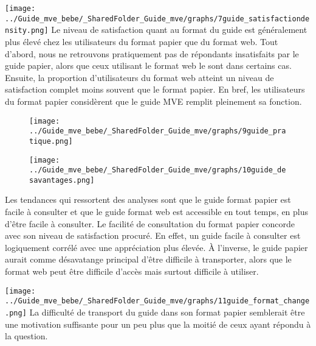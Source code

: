 \documentclass[
]{article}
\begin{document}
\texttt{[image: ../Guide\_mve\_bebe/\_SharedFolder\_Guide\_mve/graphs/7guide\_satisfactiondensity.png]}
Le niveau de satisfaction quant au format du guide est généralement plus
élevé chez les utilisateurs du format papier que du format web. Tout
d'abord, nous ne retrouvons pratiquement pas de répondants insatisfaits
par le guide papier, alors que ceux utilisant le format web le sont dans
certains cas. Ensuite, la proportion d'utilisateurs du format web
atteint un niveau de satisfaction complet moins souvent que le format
papier. En bref, les utilisateurs du format papier considèrent que le
guide MVE remplit pleinement sa fonction.

\newpage
\begin{figure}[htbp]
  \centering
  \begin{minipage}{0.5\textwidth}
    \texttt{[image: ../Guide\_mve\_bebe/\_SharedFolder\_Guide\_mve/graphs/9guide\_pratique.png]}
  \end{minipage}%
  \begin{minipage}{0.5\textwidth}
    \texttt{[image: ../Guide\_mve\_bebe/\_SharedFolder\_Guide\_mve/graphs/10guide\_desavantages.png]}
  \end{minipage}
\end{figure}

\vspace{10pt}

\begin{minipage}{1.0\textwidth}
  \textbf{} 
Les tendances qui ressortent des analyses sont que le guide format papier est facile à consulter et que le guide format web est accessible en tout temps, en plus d’être facile à consulter. Le facilité de consultation du format papier concorde avec son niveau de satisfaction procuré. En effet, un guide facile à consulter est logiquement corrélé avec une appréciation plus élevée. À l'inverse, le guide papier aurait comme désavatange principal d'être difficile à transporter, alors que le format web peut être difficile d'accès mais surtout difficile à utiliser.
\end{minipage}

\vspace{10pt}

\texttt{[image: ../Guide\_mve\_bebe/\_SharedFolder\_Guide\_mve/graphs/11guide\_format\_change.png]}
La difficulté de transport du guide dans son format papier semblerait
être une motivation suffisante pour un peu plus que la moitié de ceux
ayant répondu à la question.
\end{document}
